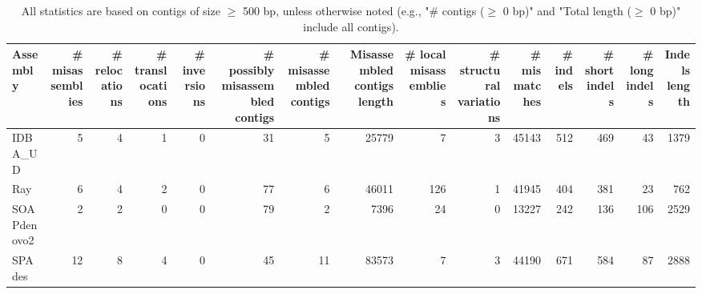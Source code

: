 \documentclass[12pt,a4paper]{article}
\begin{document}
\begin{table}[ht]
\begin{center}
\caption{All statistics are based on contigs of size $\geq$ 500 bp, unless otherwise noted (e.g., "\# contigs ($\geq$ 0 bp)" and "Total length ($\geq$ 0 bp)" include all contigs).}
\begin{tabular}{|l*{14}{|r}|}
\hline
Assembly & \# misassemblies &     \# relocations &     \# translocations &     \# inversions & \# possibly misassembled contigs & \# misassembled contigs & Misassembled contigs length & \# local misassemblies & \# structural variations & \# mismatches & \# indels &     \# short indels &     \# long indels & Indels length \\ \hline
IDBA\_UD & 5 & 4 & 1 & 0 & 31 & 5 & 25779 & 7 & 3 & 45143 & 512 & 469 & 43 & 1379 \\ \hline
Ray & 6 & 4 & 2 & 0 & 77 & 6 & 46011 & 126 & 1 & 41945 & 404 & 381 & 23 & 762 \\ \hline
SOAPdenovo2 & 2 & 2 & 0 & 0 & 79 & 2 & 7396 & 24 & 0 & 13227 & 242 & 136 & 106 & 2529 \\ \hline
SPAdes & 12 & 8 & 4 & 0 & 45 & 11 & 83573 & 7 & 3 & 44190 & 671 & 584 & 87 & 2888 \\ \hline
\end{tabular}
\end{center}
\end{table}
\end{document}
